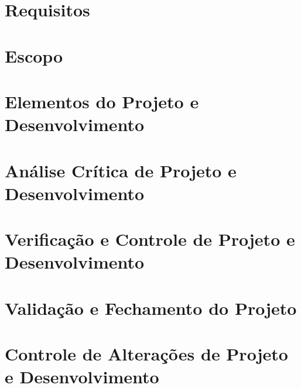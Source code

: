 \section{Requisitos}

\section{Escopo}

\section{Elementos do Projeto e Desenvolvimento}

\section{Análise Crítica de Projeto e Desenvolvimento}

\section{Verificação e Controle de Projeto e Desenvolvimento}

\section{Validação e Fechamento do Projeto}

\section{Controle de Alterações de Projeto e Desenvolvimento}


